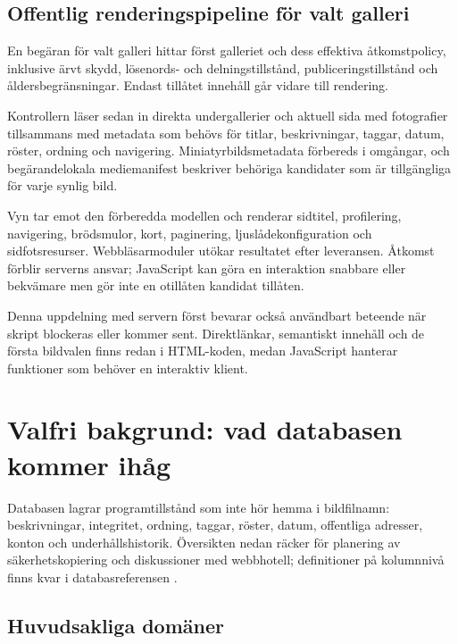 \documentclass[11pt,a4paper]{article}
\begin{document}
\subsection{Offentlig renderingspipeline för valt galleri}

En begäran för valt galleri hittar först galleriet och dess effektiva
åtkomstpolicy, inklusive ärvt skydd, lösenords- och delningstillstånd,
publiceringstillstånd och åldersbegränsningar. Endast tillåtet innehåll går
vidare till rendering.

Kontrollern läser sedan in direkta undergallerier och aktuell sida med
fotografier tillsammans med metadata som behövs för titlar, beskrivningar,
taggar, datum, röster, ordning och navigering. Miniatyrbildsmetadata förbereds i
omgångar, och begärandelokala mediemanifest beskriver behöriga kandidater som är
tillgängliga för varje synlig bild.

Vyn tar emot den förberedda modellen och renderar sidtitel, profilering,
navigering, brödsmulor, kort, paginering, ljuslådekonfiguration och
sidfotsresurser. Webbläsarmoduler utökar resultatet efter leveransen. Åtkomst
förblir serverns ansvar; JavaScript kan göra en interaktion snabbare eller
bekvämare men gör inte en otillåten kandidat tillåten.

Denna uppdelning med servern först bevarar också användbart beteende när skript
blockeras eller kommer sent. Direktlänkar, semantiskt innehåll och de första
bildvalen finns redan i HTML-koden, medan JavaScript hanterar funktioner som
behöver en interaktiv klient.

\section{Valfri bakgrund: vad databasen kommer ihåg}
\label{sec:database}

Databasen lagrar programtillstånd som inte hör hemma i bildfilnamn:
beskrivningar, integritet, ordning, taggar, röster, datum, offentliga adresser,
konton och underhållshistorik. Översikten nedan räcker för planering av
säkerhetskopiering och diskussioner med webbhotell; definitioner på kolumnnivå
finns kvar i databasreferensen \cite{database}.

\subsection{Huvudsakliga domäner}
\end{document}
